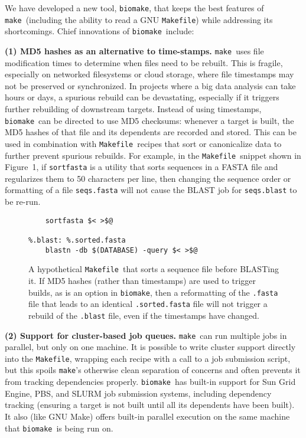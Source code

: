 \documentclass{bioinfo}
\newcommand\make{{\tt make}}
\newcommand\Makefile{{\tt Makefile}}
\newcommand\biomake{{\tt biomake}}
\begin{document}
We have developed a new tool, \biomake, that keeps the best features of \make\ (including the ability to read a GNU \Makefile) while addressing its shortcomings.
Chief innovations of \biomake\ include:

{\bf (1) MD5 hashes as an alternative to time-stamps.}
\make\ uses file modification times to determine when files need to be rebuilt.
This is fragile, especially on networked filesystems or cloud storage, where file timestamps may not be preserved or synchronized.
In projects where a big data analysis can take hours or days, a spurious rebuild can be devastating, especially if it triggers further rebuilding of downstream targets.
Instead of using timestamps, \biomake\ can be directed to use MD5 checksums: whenever a target is built, the MD5 hashes of that file and its dependents are recorded
and stored. This can be used in combination with \Makefile\ recipes that sort or canonicalize data to further prevent spurious rebuilds.
For example, in the \Makefile\ snippet shown in Figure~1,
if {\tt sortfasta} is a utility that sorts sequences in a FASTA file and regularizes them to 50 characters per line, then changing the sequence order or formatting
of a file {\tt seqs.fasta} will not cause the BLAST job for {\tt seqs.blast} to be re-run.

\begin{figure}
\begin{Verbatim}[frame=single]
%.sorted.fasta: %.fasta
    sortfasta $< >$@

%.blast: %.sorted.fasta
    blastn -db $(DATABASE) -query $< >$@
\end{Verbatim}
\caption{
  A hypothetical \Makefile\ that sorts a sequence file before BLASTing it.
  If MD5 hashes (rather than timestamps) are used to trigger builds, as is an option in \biomake,
  then a reformatting of the {\tt .fasta} file that leads to an identical {\tt .sorted.fasta} file
  will not trigger a rebuild of the {\tt .blast} file, even if the timestamps have changed.
}
\end{figure}

{\bf (2) Support for cluster-based job queues.}
\make\ can run multiple jobs in parallel, but only on one machine.
It is possible to write cluster support directly into the \Makefile,
wrapping each recipe with a call to a job submission script,
but this spoils \make's otherwise clean separation of concerns
and often prevents it from tracking dependencies properly.
\biomake\ has built-in support for Sun Grid Engine, PBS, and SLURM job submission systems,
including dependency tracking (ensuring a target is not built until all its dependents have been built).
It also (like GNU Make) offers built-in parallel execution on
the same machine that \biomake\ is being run on.
\end{document}

